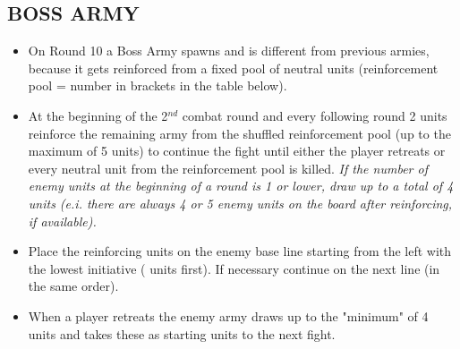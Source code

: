 \subsection*{\MakeUppercase{Boss army}}

\begin{itemize}
    \item On Round 10 a Boss Army spawns and is different from previous armies, because it gets reinforced 
    from a fixed pool of neutral units (reinforcement pool = number in brackets in the table below).
    \item At the beginning of the 2$^{nd}$ combat round and every following round 2 units reinforce the
    remaining army from the shuffled reinforcement pool (up to the maximum of 5 units) to
    continue the fight until either the player retreats or every neutral unit from the reinforcement
    pool is killed. \textit{If the number of enemy units at the beginning of a round is 1 or lower, draw up to 
    a total of 4 units (e.i. there are always 4 or 5 enemy units on the board after reinforcing, if available).}
    \item Place the reinforcing units on the enemy base line starting from the left with the lowest initiative
    ( units first). If necessary continue on the next line (in the same order).
    \item When a player retreats the enemy army draws up to the "minimum" of 4 units and takes these
    as starting units to the next fight. 
\end{itemize}

